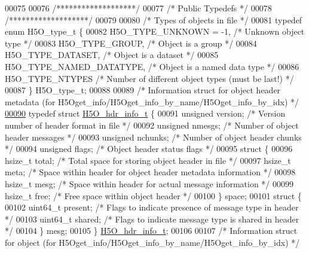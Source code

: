 \begin{DoxyCode}
00075 
00076 \textcolor{comment}{/*******************/}
00077 \textcolor{comment}{/* Public Typedefs */}
00078 \textcolor{comment}{/*******************/}
00079 
00080 \textcolor{comment}{/* Types of objects in file */}
00081 \textcolor{keyword}{typedef} \textcolor{keyword}{enum} H5O\_type\_t \{
00082     H5O\_TYPE\_UNKNOWN = -1,  \textcolor{comment}{/* Unknown object type      */}
00083     H5O\_TYPE\_GROUP,         \textcolor{comment}{/* Object is a group        */}
00084     H5O\_TYPE\_DATASET,       \textcolor{comment}{/* Object is a dataset      */}
00085     H5O\_TYPE\_NAMED\_DATATYPE,    \textcolor{comment}{/* Object is a named data type  */}
00086     H5O\_TYPE\_NTYPES             \textcolor{comment}{/* Number of different object types (must be last!) */}
00087 \} H5O\_type\_t;
00088 
00089 \textcolor{comment}{/* Information struct for object header metadata (for H5Oget\_info/H5Oget\_info\_by\_name/H5Oget\_info\_by\_idx) 
      */}
\hyperlink{struct_h5_o__hdr__info__t}{00090} \textcolor{keyword}{typedef} \textcolor{keyword}{struct }\hyperlink{struct_h5_o__hdr__info__t}{H5O\_hdr\_info\_t} \{
00091     \textcolor{keywordtype}{unsigned} version;       \textcolor{comment}{/* Version number of header format in file */}
00092     \textcolor{keywordtype}{unsigned} nmesgs;        \textcolor{comment}{/* Number of object header messages */}
00093     \textcolor{keywordtype}{unsigned} nchunks;       \textcolor{comment}{/* Number of object header chunks */}
00094     \textcolor{keywordtype}{unsigned} flags;             \textcolor{comment}{/* Object header status flags */}
00095     \textcolor{keyword}{struct }\{
00096         hsize\_t total;      \textcolor{comment}{/* Total space for storing object header in file */}
00097         hsize\_t meta;       \textcolor{comment}{/* Space within header for object header metadata information */}
00098         hsize\_t mesg;       \textcolor{comment}{/* Space within header for actual message information */}
00099         hsize\_t free;       \textcolor{comment}{/* Free space within object header */}
00100     \} space;
00101     \textcolor{keyword}{struct }\{
00102         uint64\_t present;   \textcolor{comment}{/* Flags to indicate presence of message type in header */}
00103         uint64\_t shared;    \textcolor{comment}{/* Flags to indicate message type is shared in header */}
00104     \} mesg;
00105 \} \hyperlink{struct_h5_o__hdr__info__t}{H5O\_hdr\_info\_t};
00106 
00107 \textcolor{comment}{/* Information struct for object (for H5Oget\_info/H5Oget\_info\_by\_name/H5Oget\_info\_by\_idx) */}

\end{DoxyCode}
